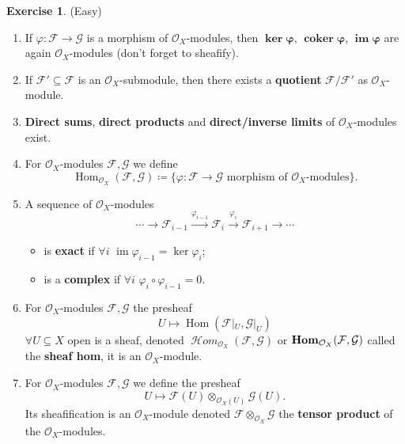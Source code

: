 \documentclass[12pt]{article}
\DeclareMathOperator{\im}{im}
\DeclareMathOperator{\coker}{coker}
\DeclareMathOperator{\Hom}{Hom}
\DeclareMathOperator{\shHom}{\mathcal H\textit{om}}
\DeclareMathOperator{\HOM}{\textnormal{\textbf{Hom}}}
\theoremstyle{definition}
\newtheorem*{exercise}{Exercise}
\begin{document}
\begin{exercise}
(Easy)
\begin{enumerate}[label=\arabic*)]
\item If $\varphi:\mathcal F\rightarrow\mathcal G$ is a morphism of $\mathcal O_X$-modules, then $\boldsymbol{\ker\varphi}$, $\boldsymbol{\coker\varphi}$, $\boldsymbol{\im\varphi}$ are again $\mathcal O_X$-modules (don't forget to sheafify).

\item If $\mathcal F'\subseteq\mathcal F$ is an $\mathcal O_X$-submodule, then there exists a \textbf{quotient} $\mathcal F/\mathcal F'$ as $\mathcal O_X$-module.

\item \textbf{Direct sums}, \textbf{direct products} and \textbf{direct/inverse limits} of $\mathcal O_X$-modules exist.

\item For $\mathcal O_X$-modules $\mathcal F,\mathcal G$ we define
\[\Hom_{\mathcal O_X}(\mathcal F,\mathcal G)\coloneqq\{\varphi:\mathcal F\rightarrow\mathcal G\text{ morphism of }\mathcal O_X\text{-modules}\}.\]

\item A sequence of $\mathcal O_X$-modules
\[\cdots\longrightarrow\mathcal F_{i-1}\xrightarrow{\varphi_{i-1}}\mathcal F_i\overset{\varphi_i}\longrightarrow\mathcal F_{i+1}\longrightarrow\cdots\]
\begin{itemize}
\item is \textbf{exact} if $\forall i$ $\im\varphi_{i-1}=\ker\varphi_i$;
\item is a \textbf{complex} if $\forall i$ $\varphi_i\circ\varphi_{i-1}=0$.
\end{itemize}

\item For $\mathcal O_X$-modules $\mathcal F,\mathcal G$ the presheaf
\[U\longmapsto\Hom(\mathcal F|_U,\mathcal G|_U)\]
$\forall U\subseteq X$ open is a sheaf, denoted $\shHom_{\mathcal O_X}(\mathcal F,\mathcal G)$ or $\HOM_{\mathcal O_X}(\mathcal F,\mathcal G)$ called the \textbf{sheaf hom}, it is an $\mathcal O_X$-module.

\item For $\mathcal O_X$-modules $\mathcal F,\mathcal G$ we define the presheaf
\[U\longmapsto\mathcal F(U)\otimes_{\mathcal O_X(U)}\mathcal G(U).\]
Its sheafification is an $\mathcal O_X$-module denoted $\mathcal F\otimes_{\mathcal O_X}\mathcal G$ the \textbf{tensor product} of the $\mathcal O_X$-modules.
\end{enumerate}
\end{exercise}
\end{document}
